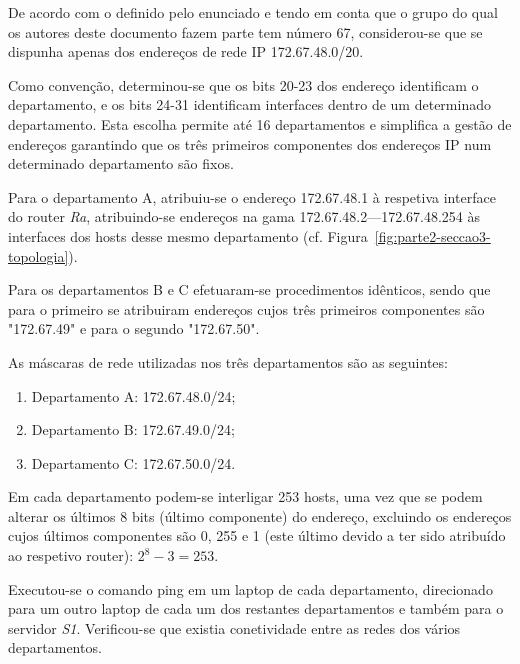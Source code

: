
De acordo com o definido pelo enunciado e tendo em conta que o grupo do qual os
autores deste documento fazem parte tem número 67, considerou-se que se dispunha
apenas dos endereços de rede IP 172.67.48.0/20.

Como convenção, determinou-se que os bits 20-23 dos endereço identificam o
departamento, e os bits 24-31 identificam interfaces dentro de um determinado
departamento. Esta escolha permite até 16 departamentos e simplifica a gestão de
endereços garantindo que os três primeiros componentes dos endereços IP num
determinado departamento são fixos.

Para o departamento A, atribuiu-se o endereço 172.67.48.1 à respetiva interface
do router \emph{Ra}, atribuindo-se endereços na gama 172.67.48.2---172.67.48.254
às interfaces dos hosts desse mesmo departamento (cf.
Figura~\ref{fig:parte2-seccao3-topologia}).

Para os departamentos B e C efetuaram-se procedimentos idênticos, sendo que para
o primeiro se atribuiram endereços cujos três primeiros componentes são
"172.67.49" e para o segundo "172.67.50".


As máscaras de rede utilizadas nos três departamentos são as seguintes:

\begin{enumerate}
  \item Departamento A: 172.67.48.0/24;
  \item Departamento B: 172.67.49.0/24;
  \item Departamento C: 172.67.50.0/24.
\end{enumerate}

Em cada departamento podem-se interligar 253 hosts, uma vez que se podem alterar
os últimos 8 bits (último componente) do endereço, excluindo os endereços cujos
últimos componentes são 0, 255 e 1 (este último devido a ter sido atribuído ao
respetivo router): \(2^8 - 3 = 253\).


Executou-se o comando ping em um laptop de cada departamento, direcionado para
um outro laptop de cada um dos restantes departamentos e também para o servidor
\emph{S1}. Verificou-se que existia conetividade entre as redes dos vários
departamentos.

